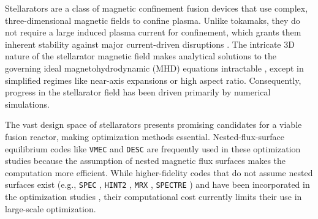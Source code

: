 \documentclass{jpp}
\begin{document}
Stellarators are a class of magnetic confinement fusion devices that use complex, three-dimensional magnetic fields to confine plasma. Unlike tokamaks, they do not require a large induced plasma current for confinement, which grants them inherent stability against major current-driven disruptions \citep{helanderTheoryPlasmaConfinement2014}. The intricate 3D nature of the stellarator magnetic field makes analytical solutions to the governing ideal magnetohydrodynamic (MHD) equations intractable \citep{freidbergIdealMHD2014}, except in simplified regimes like near-axis expansions or high aspect ratio. Consequently, progress in the stellarator field has been driven primarily by numerical simulations.

The vast design space of stellarators presents promising candidates for a viable fusion reactor, making optimization methods essential. Nested-flux-surface equilibrium codes like \texttt{VMEC} \citep{hirshmanSteepestdescentMomentMethod1983} and \texttt{DESC} \citep{dudtDESCStellaratorEquilibrium2020a, dudtDESCStellaratorCode2023, paniciDESCStellaratorCode2023, conlinDESCStellaratorCode2023a} are frequently used in these optimization studies because the assumption of nested magnetic flux surfaces makes the computation more efficient. While higher-fidelity codes that do not assume nested surfaces exist (e.g., \texttt{SPEC} \citep{hudsonComputationMultiregionRelaxed2012}, \texttt{HINT2} \citep{suzuki_development_2006}, \texttt{MRX} \citep{blickhan_mrx_2025}, \texttt{SPECTRE} \citep{balkovic_spectre_2026}) and have been incorporated in the optimization studies \citep{landremanStellaratorOptimizationGood2021, baillodStellaratorOptimizationNested2022}, their computational cost currently limits their use in large-scale optimization. 
\end{document}
